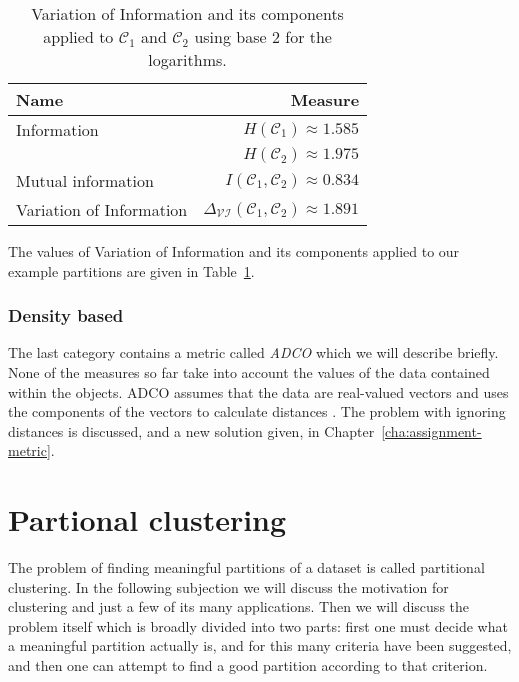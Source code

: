 \documentclass[a4paper]{report}
\newcommand{\clus}{\mathcal{C}}
\newcommand{\partcompare}[1]{\Delta_{\mathcal{#1}}(\clus_1,\clus_2)}
\begin{document}
\begin{table}
  \centering
  \begin{tabular}{lr}
    \toprule
    Name & Measure \\
    \midrule
    Information & $H(\clus_1) \approx 1.585$ \\
                & $H(\clus_2) \approx 1.975$ \\
    Mutual information & $I(\clus_1,\clus_2) \approx 0.834$ \\
    Variation of Information & $\partcompare{VI} \approx 1.891$
    \\
    \bottomrule
  \end{tabular}
  \caption{Variation of Information and its components applied to $\clus_1$
    and $\clus_2$ using base 2 for the logarithms.}
  \label{tab:vi-comparison}
\end{table}

The values of Variation of Information and its components applied to our
example partitions are given in Table~\ref{tab:vi-comparison}.

\subsubsection{Density based}
\label{sec:density-based}

The last category contains a metric called \textit{ADCO} which we will
describe briefly.  None of the measures so far take into account the values of
the data contained within the objects.  ADCO assumes that the data are
real-valued vectors and uses the components of the vectors to calculate
distances \citep{bae2010comparison}.  The problem with ignoring distances is
discussed, and a new solution given, in Chapter~\ref{cha:assignment-metric}.

\section{Partional clustering}
\label{sec:part-clust-algor}

The problem of finding meaningful partitions of a dataset is called
partitional clustering.  In the following subjection we will discuss the
motivation for clustering and just a few of its many applications.  Then we
will discuss the problem itself which is broadly divided into two parts: first
one must decide what a meaningful partition actually is, and for this many
criteria have been suggested, and then one can attempt to find a good
partition according to that criterion.
\end{document}
